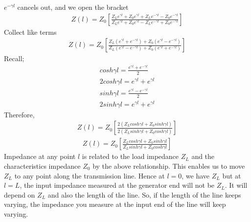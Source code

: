 $e^{-\gamma l}$ cancels out, and we open the bracket
\begin{align*}
Z(l) = Z_0 [\frac{Z_Le^{\gamma l} + Z_0e^{\gamma l} + Z_Le^{-\gamma l} - Z_0e^{-\gamma l}}{Z_L e^{\gamma l} + Z_0e^{\gamma l} - Z_Le^{-\gamma l} + Z_0e^{-\gamma l}}]
\end{align*}
Collect like terms
\begin{align*}
Z(l) = Z_0 [\frac{Z_L(e^{\gamma l} + e^{-\gamma l}) + Z_0(e^{\gamma l} - e^{-\gamma l})}{Z_L (e^{\gamma l} - e^{-\gamma l}) + Z_0(e^{\gamma l} + e^{-\gamma l})}]
\end{align*}
Recall; 
\begin{align*}
cosh\gamma l = \frac{e^{\gamma l} + e^{-\gamma l}}{2}\\
2cosh\gamma l = e^{\gamma l} + e^{\gamma l}
\end{align*}
\begin{align*}
sinh\gamma l = \frac{e^{\gamma l} - e^{-\gamma l}}{2}\\
2sinh\gamma l = e^{\gamma l} + e^{\gamma l}
\end{align*}
Therefore,
\begin{align*}
Z(l) = Z_0[\frac{2(Z_Lcosh\gamma l + Z_0sinh\gamma l)}{2(Z_Lsinh\gamma l + Z_0cosh\gamma l)}]
\end{align*}
\begin{align}
Z(l) = Z_0[\frac{Z_Lcosh\gamma l + Z_0sinh\gamma l}{Z_Lsinh\gamma l + Z_0cosh\gamma l}]
\end{align}
Impedance at any point $l$ is related to the load impedance $Z_L$ and the characteristics impedance $Z_0$ by the above relationship. This enables us to move $Z_L$ to any point along the transmission line. Hence at $l = 0$, we have $Z_L$ but at $l = L$, the input impedance measured at the generator end will not be $Z_L$. It will depend on $Z_L$ and also the length of the line. So, if the length of the line keeps varying, the impedance you measure at the input end of the line will keep varying. 

